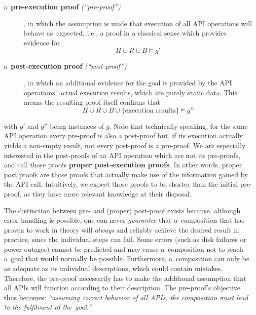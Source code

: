 \begin{description}
\item [a~{\bf pre-execution proof} \emph{(``pre-proof'')}]\hspace{-1ex},
      in which the assumption is made that execution of all API operations
      will behave as~expected, i.e., a proof in a classical sense which provides evidence for
      \[ H\cup R \cup B \models g'\]
\item [a~{\bf post-execution proof} \emph{(``post-proof'')}]\hspace{-1ex},
      in which an additional evidence for the goal %
      is provided by
      the API operations' actual execution results,
      which are purely static data. 
      This means 
      the resulting proof itself confirms that %
      \[H \cup R \cup B \cup \{\text{execution results}\} \models g'' \]
\end{description}
with $g'$ and $g''$ being instances of $g$.
Note that technically speaking,
for the same API operation every pre-proof is also a post-proof but,
if its execution actually yields a non-empty result,
not every post-proof is a pre-proof.
We are especially interested in the post-proofs of an API operation which are not its pre-proofs,
and call those proofs
\textbf{proper post-execution proofs}.
In other words, proper post proofs are those proofs
that actually make use of the information gained by the API call.
Intuitively, we expect those proofs to be shorter than the initial pre-proof,
as they have more relevant knowledge at their disposal.

The distinction between pre- and  (proper) post-proof exists because,
although error handling is possible,
one can never \emph{guarantee} that a~composition that has proven to work in theory
will \emph{always} and reliably achieve the desired result in practice,
since the individual steps can fail.
Some errors (such as disk failures or power outages) cannot be predicted
and may cause a~composition not to reach a~goal that would normally be possible.
Furthermore, a~composition can only be as adequate
as its individual descriptions, which could contain mistakes.
Therefore, the pre-proof necessarily has to make the additional assumption
that all APIs will function according to their description.
The pre-proof's objective thus becomes:
\emph{``assuming correct behavior of all APIs,
      the composition must lead to the fulfilment of the~goal.''}

